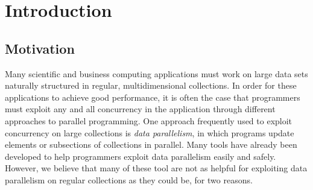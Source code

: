 \chapter{Introduction}

\section{Motivation}
Many scientific and business computing applications must work on large data sets naturally structured in regular, multidimensional collections.
In order for these applications to achieve good %
performance, it is often the case that programmers must exploit any and all concurrency %
in the application through different approaches to parallel programming.
One approach frequently used to exploit concurrency on large collections is \textit{data parallelism}, in which programs update elements or subsections of collections in parallel.
Many tools have already been developed to help programmers exploit data parallelism easily and safely. %
However, we believe that many of these tool are %
not as helpful for exploiting data parallelism on regular collections as they could be, %
for two reasons.

